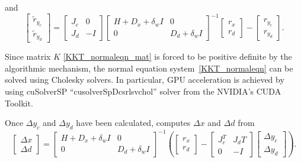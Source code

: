 and
\begin{equation} \label{KKT_normaleqn_rhs}
  \begin{bmatrix} \tilde{r}_{y_c} \\ \tilde{r}_{y_d}\end{bmatrix}
  = 
  \begin{bmatrix}
    J_c & 0 \\
    J_d & -I 
  \end{bmatrix} 
  \begin{bmatrix}
    H+D_x+\delta_{w}I & 0 \\
    0  & D_d + \delta_{w}I
  \end{bmatrix}^{-1}
  \begin{bmatrix} {r}_{x} \\ {r}_{d}\end{bmatrix}
  -
  \begin{bmatrix} r_{y_c} \\ r_{y_d}\end{bmatrix}.
\end{equation}

Since matrix $K$ \eqref{KKT_normaleqn_mat} is forced to be positive definite by the algorithmic mechanism, the normal equation system~\eqref{KKT_normaleqn} can be solved using Cholesky solvers. In particular, GPU acceleration is achieved by using  cuSolverSP ``cusolverSpDcsrlsvchol'' solver from the NVIDIA's CUDA Toolkit. 

Once $\Delta y_c$ and $\Delta y_d$ have been calculated, \Hi computes $\Delta x$ and $\Delta d$ from
\begin{equation} \label{KKT_normaleqn_step_xd}
  \begin{bmatrix} \Delta x \\ \Delta d  \end{bmatrix} 
  = 
  \begin{bmatrix}
    H+D_x+\delta_{w}I & 0 \\
    0  & D_d + \delta_{w}I
  \end{bmatrix}^{-1}
  \left( \begin{bmatrix} {r}_{x} \\ {r}_{d}\end{bmatrix}
    -
    \begin{bmatrix}
      J_c^{T} & J_d{T} \\
      0 & -I 
    \end{bmatrix}
    \begin{bmatrix} \Delta y_c \\ \Delta y_d  \end{bmatrix}
 \right).
\end{equation}




